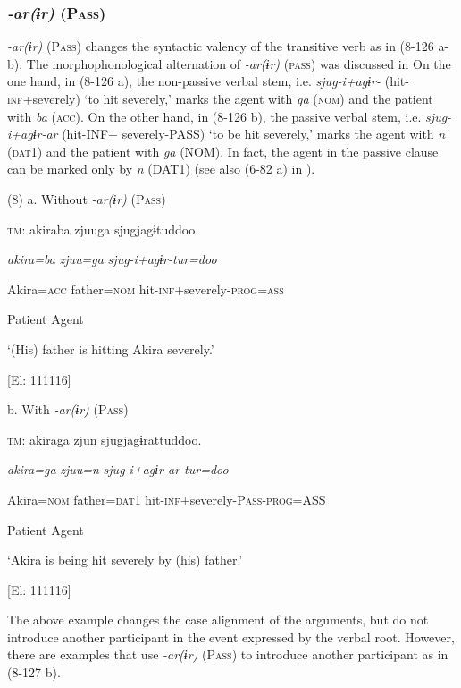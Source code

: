 \subsubsection{\textit{{}-ar(ɨr)} (P\textsc{ass})}

\textit{{}-ar(ɨr)} (P\textsc{ass}) changes the syntactic valency of the transitive verb as in (8-126 a-b). The morphophonological alternation of \textit{{}-ar(ɨr)} (\textsc{pass}) was discussed in  On the one hand, in (8-126 a), the non-passive verbal stem, i.e. \textit{sjug-i+agɨr-} (hit-\textsc{inf}+severely) ‘to hit severely,’ marks the agent with \textit{ga} (\textsc{nom}) and the patient with \textit{ba} (\textsc{acc}). On the other hand, in (8-126 b), the passive verbal stem, i.e. \textit{sjug-i+agɨr-ar} (hit-INF+ severely-PASS) ‘to be hit severely,’ marks the agent with \textit{n} (\textsc{dat}1) and the patient with \textit{ga} (NOM). In fact, the agent in the passive clause can be marked only by \textit{n} (DAT1) (see also (6-82 a) in ).

(8)  a.  Without \textit{{}-ar(ɨr)} (P\textsc{ass})

    \textsc{tm}:  akiraba  zjuuga  sjugjagɨtuddoo.

      \textit{akira=ba}  \textit{zjuu=ga}  \textit{sjug-i+agɨr{}-tur=doo}

      Akira=\textsc{acc}  father=\textsc{nom}  hit-\textsc{inf}+severely-\textsc{prog}=\textsc{ass}

      Patient  Agent  

      ‘(His) father is hitting Akira severely.’

      [El: 111116]

  b.  With \textit{{}-ar(ɨr)} (P\textsc{ass})

    \textsc{tm}:  akiraga  zjun  sjugjagɨrattuddoo.

      \textit{akira=ga}  \textit{zjuu=n}  \textit{sjug-i+agɨr-ar{}-tur=doo}

      Akira=\textsc{nom}  father=\textsc{dat}1  hit-\textsc{inf}+severely-P\textsc{ass}-\textsc{prog}=ASS

      Patient  Agent  

      ‘Akira is being hit severely by (his) father.’

      [El: 111116]

  The above example changes the case alignment of the arguments, but do not introduce another participant in the event expressed by the verbal root. However, there are examples that use \textit{{}-ar(ɨr)} (P\textsc{ass}) to introduce another participant as in (8-127 b).


